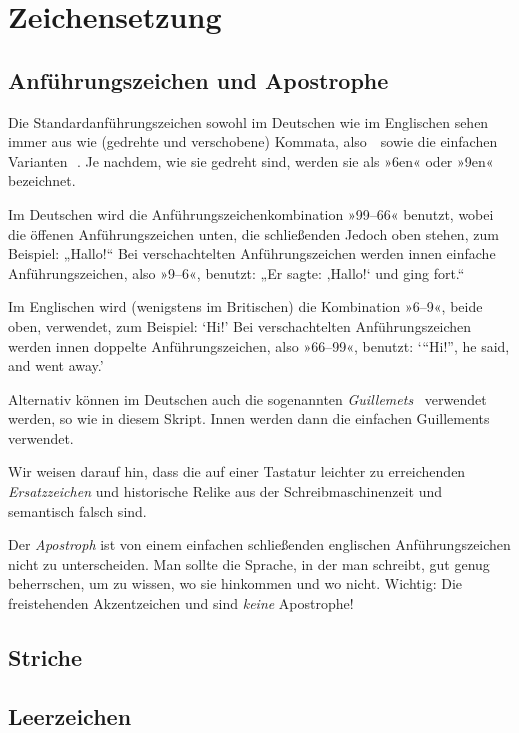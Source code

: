 \chapter{Zeichensetzung}

\lipsum[1]

\section{Anführungszeichen und Apostrophe}

Die Standardanführungszeichen sowohl im Deutschen wie im Englischen sehen immer
aus wie (gedrehte und verschobene) Kommata, also \,\,
sowie die einfachen Varianten \,\,. Je nachdem, wie sie
gedreht sind, werden sie als »6en« oder »9en« bezeichnet.

Im Deutschen wird die Anführungszeichenkombination »99–66« benutzt, wobei die
öffenen Anführungszeichen unten, die schließenden Jedoch oben stehen, zum
Beispiel: „Hallo!“ Bei verschachtelten Anführungszeichen werden innen einfache
Anführungszeichen, also »9–6«, benutzt: „Er sagte: ‚Hallo!{‘} und ging fort.“

Im Englischen wird (wenigstens im Britischen) die Kombination
»6–9«, beide oben, verwendet, zum Beispiel: ‘Hi!’ Bei verschachtelten
Anführungszeichen werden innen doppelte Anführungszeichen, also »66–99«,
benutzt: ‘“Hi!”, he said, and went away.’

Alternativ können im Deutschen auch die sogenannten \emph{Guillemets}
\, verwendet werden, so wie in diesem Skript. Innen werden dann
die einfachen Guillements \, verwendet.

Wir weisen darauf hin, dass die auf einer Tastatur leichter zu erreichenden
\emph{Ersatzzeichen}  und \Char{\textquotesingle} historische Relike aus
der Schreibmaschinenzeit und semantisch falsch sind.

Der \emph{Apostroph}  ist von einem einfachen schließenden englischen
Anführungszeichen nicht zu unterscheiden. Man sollte die Sprache, in der man
schreibt, gut genug beherrschen, um zu wissen, wo sie hinkommen und wo
nicht. Wichtig: Die freistehenden Akzentzeichen
\Char{\textasciigrave} und  sind \emph{keine} Apostrophe!


\section{Striche}

\section{Leerzeichen}

